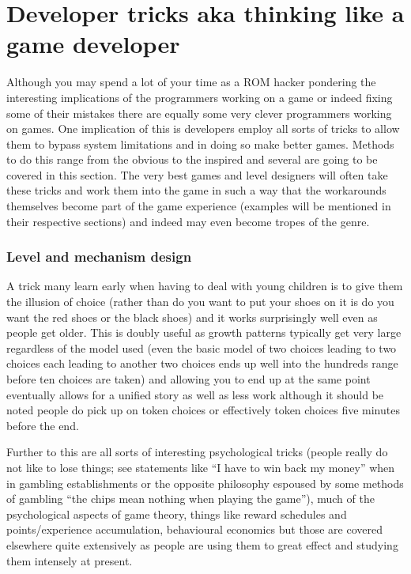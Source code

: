 \documentclass[
]{book}
\begin{document}
\hypertarget{developer-tricks-aka-thinking-like-a-game-developer}{%
\chapter{Developer tricks aka thinking like a game developer}\label{developer-tricks-aka-thinking-like-a-game-developer}}

Although you may spend a lot of your time as a ROM hacker pondering the interesting implications of the programmers working on a game or indeed fixing some of their mistakes there are equally some very clever programmers working on games. One implication of this is developers employ all sorts of tricks to allow them to bypass system limitations and in doing so make better games. Methods to do this range from the obvious to the inspired and several are going to be covered in this section. The very best games and level designers will often take these tricks and work them into the game in such a way that the workarounds themselves become part of the game experience (examples will be mentioned in their respective sections) and indeed may even become tropes of the genre.

\hypertarget{level-and-mechanism-design}{%
\subsection{Level and mechanism design}\label{level-and-mechanism-design}}

A trick many learn early when having to deal with young children is to give them the illusion of choice (rather than do you want to put your shoes on it is do you want the red shoes or the black shoes) and it works surprisingly well even as people get older. This is doubly useful as growth patterns typically get very large regardless of the model used (even the basic model of two choices leading to two choices each leading to another two choices ends up well into the hundreds range before ten choices are taken) and allowing you to end up at the same point eventually allows for a unified story as well as less work although it should be noted people do pick up on token choices or effectively token choices five minutes before the end.

Further to this are all sorts of interesting psychological tricks (people really do not like to lose things; see statements like ``I have to win back my money'' when in gambling establishments or the opposite philosophy espoused by some methods of gambling ``the chips mean nothing when playing the game''), much of the psychological aspects of game theory, things like reward schedules and points/experience accumulation, behavioural economics but those are covered elsewhere quite extensively as people are using them to great effect and studying them intensely at present.
\end{document}
